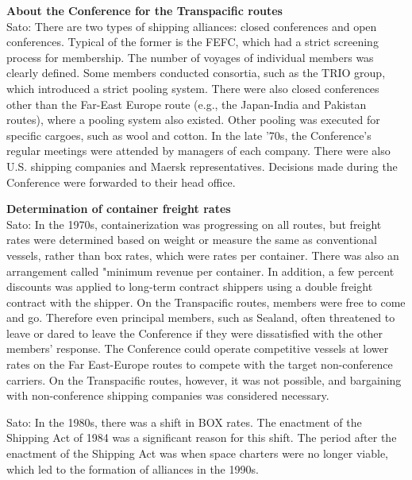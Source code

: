 \textbf{About the  Conference for the Transpacific routes} \\
Sato: There are two types of shipping alliances: closed conferences and open conferences. Typical of the former is the FEFC, which had a strict screening process for membership. The number of voyages of individual members was clearly defined. Some members conducted consortia, such as the TRIO group, which introduced a strict pooling system. There were also closed conferences other than the Far-East Europe route (e.g., the Japan-India and Pakistan routes), where a pooling system also existed. Other pooling was executed for specific cargoes, such as wool and cotton. In the late '70s, the Conference's regular meetings were attended by managers of each company. There were also U.S. shipping companies and Maersk representatives. Decisions made during the Conference were forwarded to their head office.

\textbf{Determination of container freight rates} \\
Sato: In the 1970s, containerization was progressing on all routes, but freight rates were determined based on weight or measure the same as conventional vessels, rather than box rates, which were rates per container. There was also an arrangement called "minimum revenue per container. In addition, a few percent discounts was applied to long-term contract shippers using a double freight contract with the shipper. On the Transpacific routes, members were free to come and go. Therefore even principal members, such as Sealand, often threatened to leave or dared to leave the Conference if they were dissatisfied with the other members' response. The Conference could operate competitive vessels at lower rates on the Far East-Europe routes to compete with the target non-conference carriers. On the Transpacific routes, however, it was not possible, and bargaining with non-conference shipping companies was considered necessary.

Sato: In the 1980s, there was a shift in BOX rates. The enactment of the Shipping Act of 1984 was a significant reason for this shift. The period after the enactment of the Shipping Act was when space charters were no longer viable, which led to the formation of alliances in the 1990s.